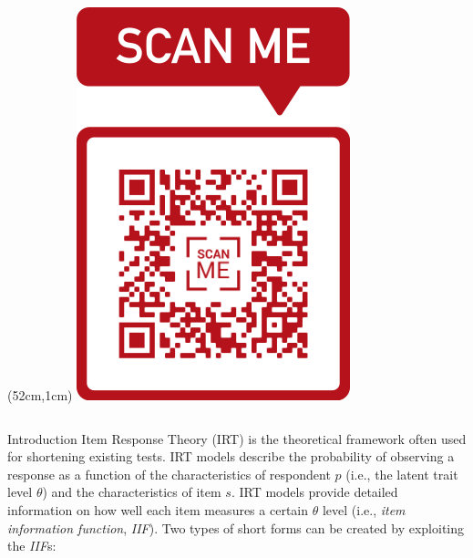 \documentclass[final,t]{beamer}
\begin{document}
\begin{frame}
\begin{center}
		\begin{textblock*}{5cm}(52cm,1cm)
			\includegraphics[width=.90\linewidth]{img/qr.png}\\
		\end{textblock*}
		
		\vspace{2mm}
		
		
		
	\end{center}
	
	
		\begin{columns}[t]
	
			
			\begin{column}{.45\linewidth}
		\begin{block}{\centering Introduction}
	Item Response Theory (IRT) is the theoretical framework often used for shortening existing tests.  IRT models describe the probability of observing a response as a function of the characteristics of respondent $p$ (i.e., the latent trait level $\theta$) and the characteristics of item $s$. IRT models provide detailed information on how well each item measures a certain $\theta$ level (i.e., \emph{item information function}, \emph{IIF}). 
	Two types of short forms can be created by exploiting the \emph{IIF}s: 
	

\end{block}
\end{column}
\end{columns}
\end{frame}
\end{document}
